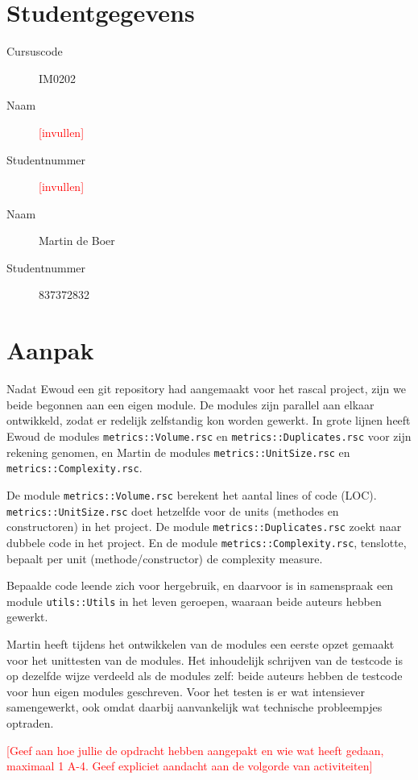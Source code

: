 \documentclass[a4paper]{article}
\newcommand{\todo}[1]{\textcolor{red}{[#1]}}
\begin{document}
\pagestyle{fancy}

\section*{Studentgegevens}
\begin{description}
	\item [Cursuscode] IM0202
	\item [Naam] \todo{invullen}
	\item [Studentnummer] \todo{invullen}
	\item [Naam] Martin de Boer
	\item [Studentnummer] 837372832
\end{description}

\section*{Aanpak}
Nadat Ewoud een git repository had aangemaakt voor het rascal
project, zijn we beide begonnen aan een eigen module. De modules
zijn parallel aan elkaar ontwikkeld, zodat er redelijk
zelfstandig kon worden gewerkt. In grote lijnen heeft Ewoud de
modules \texttt{metrics::Volume.rsc} en
\texttt{metrics::Duplicates.rsc} voor zijn rekening genomen, en
Martin de modules \texttt{metrics::UnitSize.rsc} en
\texttt{metrics::Complexity.rsc}.

De module \texttt{metrics::Volume.rsc} berekent het aantal lines
of code (LOC). \texttt{metrics::UnitSize.rsc} doet hetzelfde
voor de units (methodes en constructoren) in het project. De
module \texttt{metrics::Duplicates.rsc} zoekt naar dubbele code
in het project. En de module \texttt{metrics::Complexity.rsc},
tenslotte, bepaalt per unit (methode/constructor) de complexity
measure.

Bepaalde code leende zich voor hergebruik, en daarvoor is in
samenspraak een module \texttt{utils::Utils} in het leven
geroepen, waaraan beide auteurs hebben gewerkt.

Martin heeft tijdens het ontwikkelen van de modules een eerste
opzet gemaakt voor het unittesten van de modules. Het
inhoudelijk schrijven van de testcode is op dezelfde wijze
verdeeld als de modules zelf: beide auteurs hebben de testcode
voor hun eigen modules geschreven. Voor het testen is er wat
intensiever samengewerkt, ook omdat daarbij aanvankelijk wat
technische probleempjes optraden.

\todo{Geef aan hoe jullie de opdracht hebben aangepakt en wie
wat heeft gedaan, maximaal 1 A-4. Geef expliciet aandacht aan de
volgorde van activiteiten}
\end{document}
